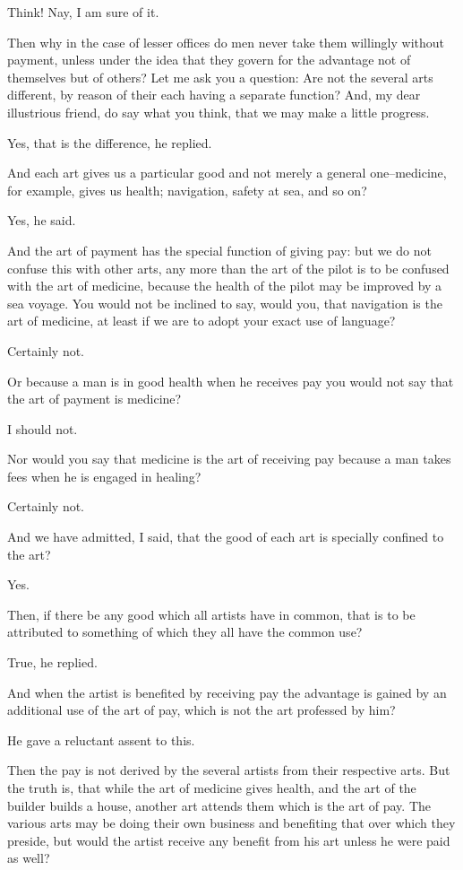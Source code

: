 Think! Nay, I am sure of it.

Then why in the case of lesser offices do men never take them willingly
without payment, unless under the idea that they govern for the
advantage not of themselves but of others? Let me ask you a question:
Are not the several arts different, by reason of their each having a
separate function? And, my dear illustrious friend, do say what you
think, that we may make a little progress.

Yes, that is the difference, he replied.

And each art gives us a particular good and not merely a general
one--medicine, for example, gives us health; navigation, safety at sea,
and so on?

Yes, he said.

And the art of payment has the special function of giving pay: but we do
not confuse this with other arts, any more than the art of the pilot is
to be confused with the art of medicine, because the health of the pilot
may be improved by a sea voyage. You would not be inclined to say, would
you, that navigation is the art of medicine, at least if we are to adopt
your exact use of language?

Certainly not.

Or because a man is in good health when he receives pay you would not
say that the art of payment is medicine?

I should not.

Nor would you say that medicine is the art of receiving pay because a
man takes fees when he is engaged in healing?

Certainly not.

And we have admitted, I said, that the good of each art is specially
confined to the art?

Yes.

Then, if there be any good which all artists have in common, that is to
be attributed to something of which they all have the common use?

True, he replied.

And when the artist is benefited by receiving pay the advantage is
gained by an additional use of the art of pay, which is not the art
professed by him?

He gave a reluctant assent to this.

Then the pay is not derived by the several artists from their respective
arts. But the truth is, that while the art of medicine gives health, and
the art of the builder builds a house, another art attends them which
is the art of pay. The various arts may be doing their own business and
benefiting that over which they preside, but would the artist receive
any benefit from his art unless he were paid as well?

